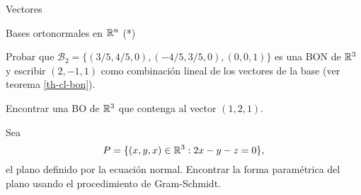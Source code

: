 \begin{chapter}{Vectores}
\begin{section}{Bases ortonormales en $\mathbb R^n$ (*)}
\begin{enumex}
    \item  Probar que  $\mathcal B_2 = \{(3/5, 4/5,0 ), (- 4/5, 3/5,0),  (0,0,1 )\}$ es una BON  de $\mathbb R^3$ y escribir $(2,-1,1)$ como combinación lineal de los vectores de la base (ver teorema \ref{th-cl-bon}).
    \item Encontrar una BO de $\mathbb R^3$ que contenga al vector $(1,2,1)$.
    \item Sea
    $$
    P = \{(x,y,x) \in \mathbb R^3: 2x -y-z =0\},
    $$ 
    el plano definido por la ecuación normal. Encontrar la forma paramétrica del plano usando el procedimiento de Gram-Schmidt.  
\end{enumex}

\end{section}

\end{chapter}